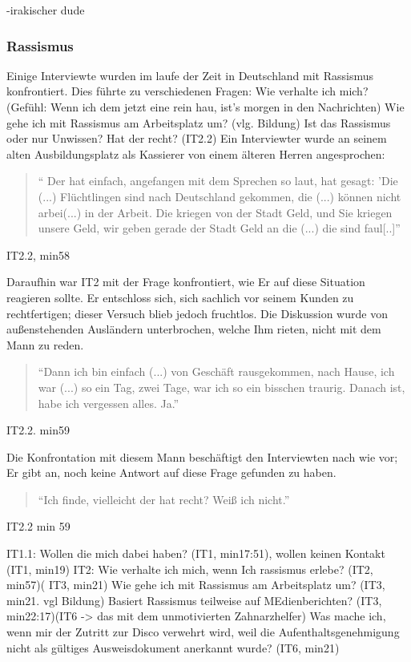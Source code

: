     -irakischer dude


\subsubsection{Rassismus}

Einige Interviewte wurden im laufe der Zeit in Deutschland mit Rassismus konfrontiert. Dies führte zu verschiedenen Fragen: 
    Wie verhalte ich mich? (Gefühl: Wenn ich dem jetzt eine rein hau, ist's morgen in den Nachrichten)
    Wie gehe ich mit Rassismus am Arbeitsplatz um? (vlg. Bildung)
    Ist das Rassismus oder nur Unwissen?
    Hat der recht? (IT2.2)
Ein Interviewter wurde an seinem alten Ausbildungsplatz als Kassierer von einem älteren Herren angesprochen:
\begin{quote}
    `` Der hat einfach, angefangen mit dem Sprechen so laut, hat gesagt: 'Die (...) Flüchtlingen sind nach Deutschland gekommen, die (...) können nicht arbei(...) in der Arbeit. Die kriegen von der Stadt Geld, und Sie kriegen unsere Geld, wir geben gerade der Stadt Geld an die (...) die sind faul[..]'' 
\end{quote}
\caption{IT2.2, min58}
Daraufhin war IT2 mit der Frage konfrontiert, wie Er auf diese Situation reagieren sollte. Er entschloss sich, sich sachlich vor seinem Kunden zu rechtfertigen; dieser Versuch blieb jedoch fruchtlos. Die Diskussion wurde von außenstehenden Ausländern unterbrochen, welche Ihm rieten, nicht mit dem Mann zu reden.
\begin{quote}
    ``Dann ich bin einfach (...) von Geschäft rausgekommen, nach Hause, ich war (...) so ein Tag, zwei Tage, war ich so ein bisschen traurig. Danach ist, habe ich vergessen alles. Ja.''
\end{quote}
\caption{IT2.2. min59}
Die Konfrontation mit diesem Mann beschäftigt den Interviewten nach wie vor; Er gibt an, noch keine Antwort auf diese Frage gefunden zu haben.
\begin{quote}
    ``Ich finde, vielleicht der hat recht? Weiß ich nicht.''
\end{quote}
\caption{IT2.2 min 59}

    
    IT1.1: Wollen die mich dabei haben? (IT1, min17:51), wollen keinen Kontakt (IT1, min19)
    IT2: Wie verhalte ich mich, wenn Ich rassismus erlebe? (IT2, min57)( IT3, min21)
    Wie gehe ich mit Rassismus am Arbeitsplatz um? (IT3, min21. vgl Bildung)
    Basiert Rassismus teilweise auf MEdienberichten? (IT3, min22:17)(IT6 -> das mit dem unmotivierten Zahnarzhelfer)
    Was mache ich, wenn mir der Zutritt zur Disco verwehrt wird, weil die Aufenthaltsgenehmigung nicht als gültiges Ausweisdokument anerkannt wurde? (IT6, min21)
    
